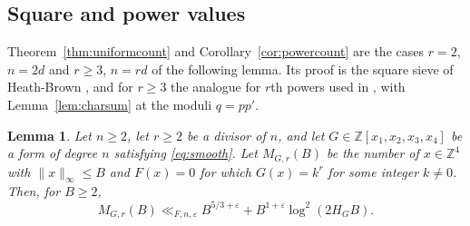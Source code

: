 \documentclass[11pt]{amsart}
\numberwithin{equation}{section}
\numberwithin{figure}{section}
\newtheorem{lemma}{Lemma}[section]
\theoremstyle{definition}
\newcommand{\Z}{\mathbb{Z}}
\newcommand{\eps}{\varepsilon}
\begin{document}
\subsection{Square and power values}\label{sec:sieve}

Theorem~\ref{thm:uniformcount} and Corollary~\ref{cor:powercount}
are the cases $r=2$, $n=2d$ and $r\ge3$, $n=rd$ of the following
lemma. Its proof is the square sieve of Heath-Brown \cite{HB2}, and
for $r\ge3$ the analogue for $r$th powers used in
\cite[Section~2]{HBP}, with
Lemma~\ref{lem:charsum} at the moduli $q=pp'$.

\begin{lemma}\label{lem:sieve}
Let $n\ge2$, let $r\ge2$ be a divisor of $n$, and let
$G\in\Z[x_1,x_2,x_3,x_4]$ be a form of degree $n$ satisfying
\eqref{eq:smooth}. Let $M_{G,r}(B)$ be the number of $x\in\Z^4$ with
$\lVert x\rVert_\infty\le B$ and $F(x)=0$ for which $G(x)=k^r$ for
some integer $k\ne0$. Then, for $B\ge2$,
\begin{equation}\label{eq:sieve}
 M_{G,r}(B)\ll_{F,n,\eps}B^{5/3+\eps}+B^{1+\eps}\log^2(2H_GB).
\end{equation}
\end{lemma}
\end{document}
